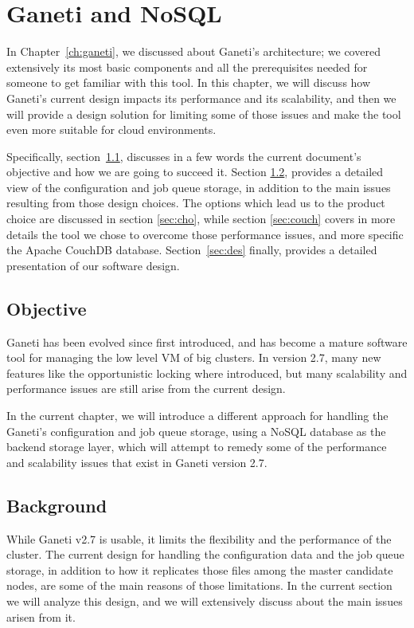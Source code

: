 \chapter{Ganeti and NoSQL}\label{ch:backend}

In Chapter~\ref{ch:ganeti}, we discussed about Ganeti's architecture; we covered
extensively its most basic components and all the prerequisites needed for
someone to get familiar with this tool. In this chapter, we will discuss how
Ganeti's current design impacts its performance and its scalability, and
then we will provide a design solution for limiting some of those issues and make
the tool even more suitable for cloud environments.

Specifically, section~\ref{sec:obj}, discusses in a few words the current
document's objective and how we are going to succeed it. Section
\ref{sec:back}, provides a detailed view of the configuration and job queue
storage, in addition to the main issues resulting from those design choices. The
options which lead us to the product choice are discussed in section
\ref{sec:cho}, while section \ref{sec:couch} covers in more details the tool
we chose to overcome those performance issues, and more specific the Apache
CouchDB database. Section~\ref{sec:des} finally, provides a detailed
presentation of our software design.

\section{Objective}\label{sec:obj}

Ganeti has been evolved since first introduced, and has become a mature software
tool for managing the low level VM of big clusters. In version 2.7, many new
features like the opportunistic locking where introduced, but many scalability
and performance issues are still arise from the current design.

In the current chapter, we will introduce a different approach for handling the
Ganeti's configuration and job queue storage, using a NoSQL database as the
backend storage layer, which will attempt to remedy some of the performance and
scalability issues that exist in Ganeti version 2.7.

\section{Background}\label{sec:back}

While Ganeti v2.7 is usable, it limits the flexibility and the performance of
the cluster. The current design for handling the configuration data and the job
queue storage, in addition to how it replicates those files among the master
candidate nodes, are some of the main reasons of those limitations. In the
current section we will analyze this design, and we will extensively discuss
about the main issues arisen from it.

